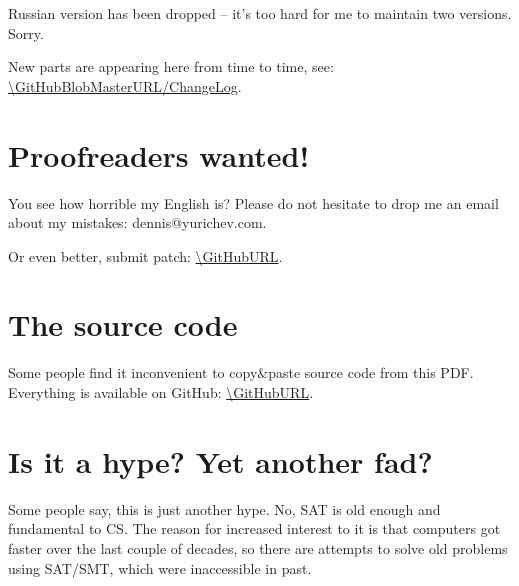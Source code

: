 Russian version has been dropped -- it's too hard for me to maintain two versions. Sorry.

New parts are appearing here from time to time, see: \url{\GitHubBlobMasterURL/ChangeLog}.

\section{Proofreaders wanted!}

You see how horrible my English is?
Please do not hesitate to drop me an email about my mistakes:
dennis@yurichev.com.

Or even better, submit patch: \url{\GitHubURL}.

\iffalse
\section{Illustrator wanted}

... who can draw in the following manner:
\href{https://github.com/DennisYurichev/RE-for-beginners/blob/master/cover.jpg}{1},
\href{https://github.com/DennisYurichev/RE-for-beginners/blob/master/cover2.jpg}{2},
\href{https://github.com/DennisYurichev/RE-for-beginners/blob/master/cover3.jpg}{3},
\href{https://github.com/DennisYurichev/RE-for-beginners/blob/master/cover4.jpg}{4}.

... for this book, which is open-source and free, and unlikely to be published.
However, someone maybe interested, in a self-advertisement sense...

Please contact me: dennis@yurichev.com.
\fi

\section{The source code}

Some people find it inconvenient to copy\&paste source code from this PDF.
Everything is available on GitHub: \url{\GitHubURL}.

\section{Is it a hype? Yet another fad?}

Some people say, this is just another hype.
No, \ac{SAT} is old enough and fundamental to \ac{CS}.
The reason for increased interest to it is that computers got faster over the last couple of decades,
so there are attempts to solve old problems using \ac{SAT}/\ac{SMT}, which were inaccessible in past.

